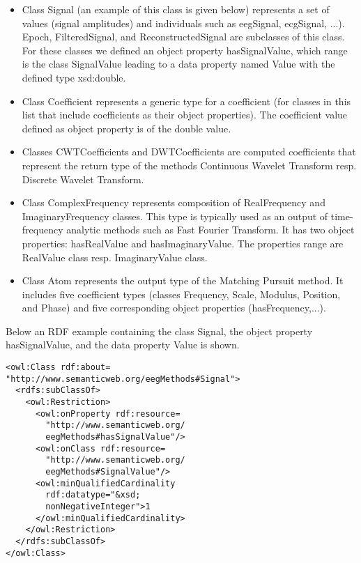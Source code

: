 \documentclass[a4paper,twoside]{article}
\begin{document}
\begin{itemize}
\item Class Signal (an example of this class is given below) represents a set of values (signal amplitudes) and individuals such as eegSignal, ecgSignal, ...). Epoch, FilteredSignal, and ReconstructedSignal are subclasses of this class. For these classes we defined an object property hasSignalValue, which range is the class SignalValue leading to a data property named Value with the defined type xsd:double.

\item Class Coefficient represents a generic type for a coefficient (for classes in this list that include coefficients as their object properties). The coefficient value defined as object property is of the double value.

\item Classes CWTCoefficients and DWTCoefficients are computed coefficients that represent the return type of the methods Continuous Wavelet Transform resp. Discrete Wavelet Transform.

\item Class ComplexFrequency represents composition of RealFrequency and ImaginaryFrequency classes. This type is typically used as an output of time-frequency analytic methods such as Fast Fourier Transform. It has two object properties: hasRealValue and hasImaginaryValue. The properties range are RealValue class resp. ImaginaryValue class.

\item Class Atom represents the output type of the Matching Pursuit method. It includes five coefficient types (classes Frequency, Scale, Modulus, Position, and Phase) and five corresponding object properties (hasFrequency,...).
\end{itemize}

Below an RDF example containing the class Signal, the object property hasSignalValue, and the data property Value is shown.

\begin{small}
\begin{verbatim}
<owl:Class rdf:about=
"http://www.semanticweb.org/eegMethods#Signal">
  <rdfs:subClassOf>
    <owl:Restriction>
      <owl:onProperty rdf:resource=
        "http://www.semanticweb.org/
        eegMethods#hasSignalValue"/>
      <owl:onClass rdf:resource=
        "http://www.semanticweb.org/
        eegMethods#SignalValue"/>
      <owl:minQualifiedCardinality
        rdf:datatype="&xsd;
        nonNegativeInteger">1
      </owl:minQualifiedCardinality>
    </owl:Restriction>
  </rdfs:subClassOf>
</owl:Class>
\end{verbatim}
\end{small}
\end{document}
